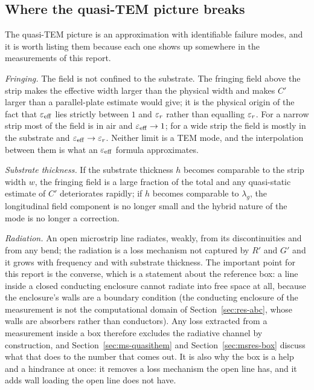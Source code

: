 \subsection{Where the quasi-TEM picture breaks}
\label{sec:tline-limits}

The quasi-TEM picture is an approximation with identifiable failure modes, and it is worth listing them because
each one shows up somewhere in the measurements of this report.

\emph{Fringing.} The field is not confined to the substrate. The fringing field above the strip makes the
effective width larger than the physical width and makes $C'$ larger than a parallel-plate estimate would give;
it is the physical origin of the fact that $\varepsilon_{\mathrm{eff}}$ lies strictly between $1$ and $\varepsilon_r$ rather
than equalling $\varepsilon_r$. For a narrow strip most of the field is in air and $\varepsilon_{\mathrm{eff}}\to1$; for a
wide strip the field is mostly in the substrate and $\varepsilon_{\mathrm{eff}}\to\varepsilon_r$. Neither limit is a TEM mode,
and the interpolation between them is what an $\varepsilon_{\mathrm{eff}}$ formula approximates.

\emph{Substrate thickness.} If the substrate thickness $h$ becomes comparable to the strip width $w$, the
fringing field is a large fraction of the total and any quasi-static estimate of $C'$ deteriorates rapidly; if
$h$ becomes comparable to $\lambda_g$, the longitudinal field component is no longer small and the hybrid nature
of the mode is no longer a correction.

\emph{Radiation.} An open microstrip line radiates, weakly, from its discontinuities and from any bend; the
radiation is a loss mechanism not captured by $R'$ and $G'$ and it grows with frequency and with substrate
thickness. The important point for this report is the converse, which is a statement about the reference box: a
line inside a closed conducting enclosure cannot radiate into free space at all, because the enclosure's walls
are a boundary condition (the conducting enclosure of the measurement is not the computational domain of
Section~\ref{sec:res-abc}, whose walls are absorbers rather than conductors). Any loss extracted from a
measurement inside a box therefore excludes the radiative channel by construction, and
Section~\ref{sec:ms-quasithem} and Section~\ref{sec:msres-box} discuss what that does to the number that comes
out. It is also why the box is a help and a hindrance at once: it removes a loss mechanism the open line has,
and it adds wall loading the open line does not have.

